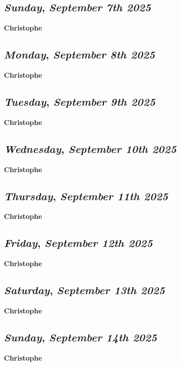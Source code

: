 \def\day{\textit{September 7th 2025}}
\def\weekday{\textit{Sunday}}
\subsection*{\weekday, \day}
\textbf {Christophe}

\def\day{\textit{September 8th 2025}}
\def\weekday{\textit{Monday}}
\subsection*{\weekday, \day}
\textbf {Christophe}

\def\day{\textit{September 9th 2025}}
\def\weekday{\textit{Tuesday}}
\subsection*{\weekday, \day}
\textbf {Christophe}

\def\day{\textit{September 10th 2025}}
\def\weekday{\textit{Wednesday}}
\subsection*{\weekday, \day}
\textbf {Christophe}

\def\day{\textit{September 11th 2025}}
\def\weekday{\textit{Thursday}}
\subsection*{\weekday, \day}
\textbf {Christophe}

\def\day{\textit{September 12th 2025}}
\def\weekday{\textit{Friday}}
\subsection*{\weekday, \day}
\textbf {Christophe}

\def\day{\textit{September 13th 2025}}
\def\weekday{\textit{Saturday}}
\subsection*{\weekday, \day}
\textbf {Christophe}

\def\day{\textit{September 14th 2025}}
\def\weekday{\textit{Sunday}}
\subsection*{\weekday, \day}
\textbf {Christophe}

\def\day{\textit{September 15th 2025}}
\def\weekday{\textit{Monday}}
